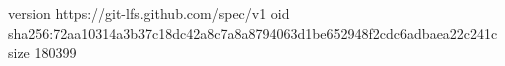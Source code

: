 version https://git-lfs.github.com/spec/v1
oid sha256:72aa10314a3b37c18dc42a8c7a8a8794063d1be652948f2cdc6adbaea22c241c
size 180399

